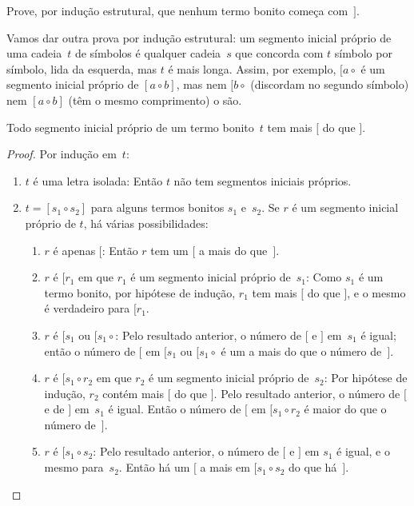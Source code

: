 \documentclass[../../../include/open-logic-section]{subfiles}
\begin{document}
\begin{prob}
  Prove, por indução estrutural, que nenhum termo bonito começa com~$]$.
\end{prob}

Vamos dar outra prova por indução estrutural: um segmento inicial próprio
de uma cadeia~$t$ de símbolos é qualquer cadeia~$s$ que concorda com
$t$ símbolo por símbolo, lida da esquerda, mas $t$ é mais longa. Assim,
por exemplo, $[a \circ {}$ é um segmento inicial próprio de $[a \circ b]$, mas
nem $[b \circ {}$ (discordam no segundo símbolo) nem $[a
\circ b]$ (têm o mesmo comprimento) o são.

\begin{prop}
  Todo segmento inicial próprio de um termo bonito~$t$ tem mais $[$ do que
    $]$.
\end{prop}

\begin{proof}
  Por indução em~$t$:
  \begin{enumerate}
  \item $t$ é uma letra isolada: Então $t$ não tem segmentos iniciais próprios.
  \item $t = [s_1 \circ s_2]$ para alguns termos bonitos $s_1$ e~$s_2$. Se $r$ é
    um segmento inicial próprio de $t$, há várias
    possibilidades:
    \begin{enumerate}
    \item $r$ é apenas $[$: Então $r$ tem um $[$ a mais do que~$]$.
    \item $r$ é $[r_1$ em que $r_1$ é um segmento inicial próprio
      de~$s_1$: Como $s_1$ é um termo bonito, por hipótese de indução, $r_1$
      tem mais $[$ do que $]$, e o mesmo é verdadeiro para $[r_1$.
    \item $r$ é $[s_1$ ou $[s_1 \circ {}$: Pelo resultado anterior, o
      número de $[$ e $]$ em~$s_1$ é igual; então o número de $[$
      em $[s_1$ ou $[s_1 \circ {}$ é um a mais do que o número de~$]$.
    \item $r$ é $[s_1 \circ r_2$ em que $r_2$ é um segmento inicial próprio
      de~$s_2$:  Por hipótese de indução, $r_2$ contém mais $[$ do que
      $]$. Pelo resultado anterior, o número de $[$ e de
      $]$ em~$s_1$ é igual. Então o número de $[$ em $[s_1 \circ r_2$
      é maior do que o número de~$]$.
    \item $r$ é $[s_1 \circ s_2$: Pelo resultado anterior, o número de
      $[$ e $]$ em $s_1$ é igual, e o mesmo para~$s_2$. Então há
      um $[$ a mais em $[s_1 \circ s_2$ do que há~$]$.
    \end{enumerate}
  \end{enumerate}
\end{proof}
\end{document}
